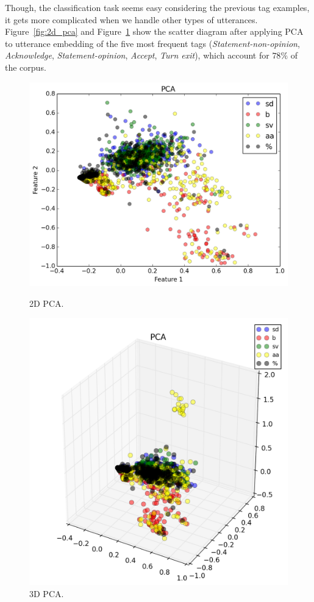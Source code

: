Though, the classification task seems easy considering the previous tag examples, it gets more complicated when we handle other types of utterances.
Figure~\ref{fig:2d_pca} and Figure~\ref{fig:3d_pca} show the scatter diagram after applying PCA to utterance embedding of the five most frequent tags (\emph{Statement-non-opinion}, \emph{Acknowledge}, \emph{Statement-opinion}, \emph{Accept}, \emph{Turn exit}), which account for $78\%$ of the corpus.

\begin{figure}
\centering
\begin{minipage}{.23\textwidth}
\includegraphics[width=1\textwidth]{img/complex_pca_2d}
\caption{2D PCA.}
\label{fig:2d_pca}
\end{minipage}
\begin{minipage}{.23\textwidth}
\includegraphics[width=1\textwidth]{img/complex_pca_3d}
\caption{3D PCA.}
\label{fig:3d_pca}
\end{minipage}
\end{figure}
